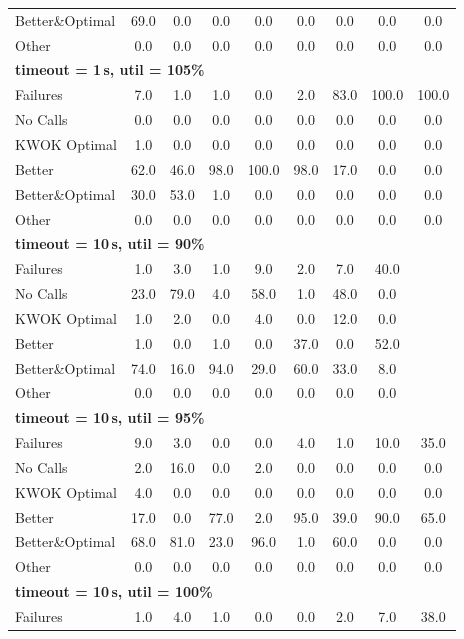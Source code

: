 \begin{tabular}{l cccccccc}
Better\&Optimal & 69.0 & 0.0 & 0.0 & 0.0 & 0.0 & 0.0 & 0.0 & 0.0 \\
Other & 0.0 & 0.0 & 0.0 & 0.0 & 0.0 & 0.0 & 0.0 & 0.0 \\
\midrule
\multicolumn{9}{l}{\textbf{timeout = 1\,s, util = 105\%}} \\
\midrule
Failures & 7.0 & 1.0 & 1.0 & 0.0 & 2.0 & 83.0 & 100.0 & 100.0 \\
No Calls & 0.0 & 0.0 & 0.0 & 0.0 & 0.0 & 0.0 & 0.0 & 0.0 \\
KWOK Optimal & 1.0 & 0.0 & 0.0 & 0.0 & 0.0 & 0.0 & 0.0 & 0.0 \\
Better & 62.0 & 46.0 & 98.0 & 100.0 & 98.0 & 17.0 & 0.0 & 0.0 \\
Better\&Optimal & 30.0 & 53.0 & 1.0 & 0.0 & 0.0 & 0.0 & 0.0 & 0.0 \\
Other & 0.0 & 0.0 & 0.0 & 0.0 & 0.0 & 0.0 & 0.0 & 0.0 \\
\midrule
\multicolumn{9}{l}{\textbf{timeout = 10\,s, util = 90\%}} \\
\midrule
Failures & 1.0 & 3.0 & 1.0 & 9.0 & 2.0 & 7.0 & 40.0 & \text{--} \\
No Calls & 23.0 & 79.0 & 4.0 & 58.0 & 1.0 & 48.0 & 0.0 & \text{--} \\
KWOK Optimal & 1.0 & 2.0 & 0.0 & 4.0 & 0.0 & 12.0 & 0.0 & \text{--} \\
Better & 1.0 & 0.0 & 1.0 & 0.0 & 37.0 & 0.0 & 52.0 & \text{--} \\
Better\&Optimal & 74.0 & 16.0 & 94.0 & 29.0 & 60.0 & 33.0 & 8.0 & \text{--} \\
Other & 0.0 & 0.0 & 0.0 & 0.0 & 0.0 & 0.0 & 0.0 & \text{--} \\
\midrule
\multicolumn{9}{l}{\textbf{timeout = 10\,s, util = 95\%}} \\
\midrule
Failures & 9.0 & 3.0 & 0.0 & 0.0 & 4.0 & 1.0 & 10.0 & 35.0 \\
No Calls & 2.0 & 16.0 & 0.0 & 2.0 & 0.0 & 0.0 & 0.0 & 0.0 \\
KWOK Optimal & 4.0 & 0.0 & 0.0 & 0.0 & 0.0 & 0.0 & 0.0 & 0.0 \\
Better & 17.0 & 0.0 & 77.0 & 2.0 & 95.0 & 39.0 & 90.0 & 65.0 \\
Better\&Optimal & 68.0 & 81.0 & 23.0 & 96.0 & 1.0 & 60.0 & 0.0 & 0.0 \\
Other & 0.0 & 0.0 & 0.0 & 0.0 & 0.0 & 0.0 & 0.0 & 0.0 \\
\midrule
\multicolumn{9}{l}{\textbf{timeout = 10\,s, util = 100\%}} \\
\midrule
Failures & 1.0 & 4.0 & 1.0 & 0.0 & 0.0 & 2.0 & 7.0 & 38.0 \\

\end{tabular}
